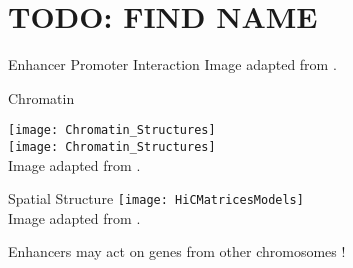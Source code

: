 \section{TODO: FIND NAME}


\begin{frame}[c]{Enhancer Promoter Interaction}
    \only<-1>{\texttt{[image: Enhancer\_Nucleotide\_Sequence]}}
    Image adapted from \cite{figenhancers}.



\end{frame}


\begin{frame}[c]{Chromatin}

    {\texttt{[image: Chromatin\_Structures]}} \\
    {\texttt{[image: Chromatin\_Structures]}} \\
    Image adapted from \cite{figchromatinstructures}.

\end{frame}


\begin{frame}[c]{Spatial Structure}
    \vfill
    \texttt{[image: HiCMatricesModels]} \\
    Image adapted from \cite{rao20143d}.
\end{frame}


\begin{frame}[standout]
    \Large
    Enhancers may act on genes from other chromosomes
    \cite{spilianakis2005interchromosomal}!
\end{frame}





